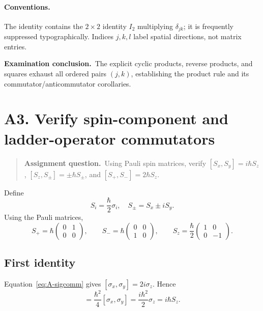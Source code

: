 \documentclass[11pt,a4paper]{article}
\theoremstyle{definition}
\newenvironment{question}{\begin{quote}\small\noindent\textbf{Assignment question.}\ }{\end{quote}}
\newcommand{\exam}[1]{\par\medskip\noindent\textbf{Examination conclusion.}\ #1\par}
\begin{document}
\paragraph{Conventions.} The identity contains the $2\times2$ identity $I_2$ multiplying $\delta_{jk}$; it is frequently suppressed typographically. Indices $j,k,l$ label spatial directions, not matrix entries.
\exam{The explicit cyclic products, reverse products, and squares exhaust all ordered pairs $(j,k)$, establishing the product rule and its commutator/anticommutator corollaries.}

\section{A3. Verify spin-component and ladder-operator commutators}
\begin{question}Using Pauli spin matrices, verify $[S_x,S_y]=i\hbar S_z$, $[S_z,S_\pm]=\pm\hbar S_\pm$, and $[S_+,S_-]=2\hbar S_z$.\end{question}
Define
\begin{equation}
S_i=\frac\hbar2\sigma_i,\quad
S_\pm=S_x\pm iS_y.
\end{equation}
Using the Pauli matrices,
\begin{equation}
S_+=\hbar\begin{pmatrix}0&1\\0&0\end{pmatrix},\qquad
S_-=\hbar\begin{pmatrix}0&0\\1&0\end{pmatrix},\qquad
S_z=\frac\hbar2\begin{pmatrix}1&0\\0&-1\end{pmatrix}.
\end{equation}
\subsection{First identity}
Equation~\eqref{eq:A-sigcomm} gives $[\sigma_x,\sigma_y]=2i\sigma_z$. Hence
\begin{equation}
[S_x,S_y]=\frac{\hbar^2}{4}[\sigma_x,\sigma_y]
=\frac{i\hbar^2}{2}\sigma_z=i\hbar S_z.
\end{equation}
\end{document}
